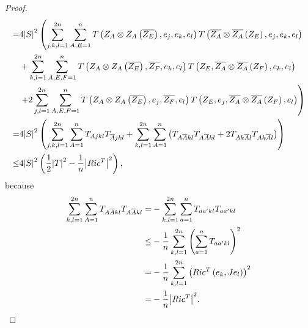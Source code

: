 \documentclass{amsart}
\theoremstyle{definition}
\theoremstyle{remark}
\numberwithin{equation}{section}
\begin{document}
\begin{proof}
\begin{align*}
   =& 4{\left| S \right|^2}\left( {\sum\limits_{j,k,l = 1}^{2n} {\sum\limits_{A,E = 1}^n {T\left( {{Z_A} \otimes {Z_A}\left( {\overline {{Z_E}} } \right),{e_j},{e_k},{e_l}} \right)T\left( {\overline {{Z_A}}  \otimes \overline {{Z_A}} \left( {{Z_E}} \right),{e_j},{e_k},{e_l}} \right)} } } \right. \hfill \\
   &+ \sum\limits_{k,l = 1}^{2n} {\sum\limits_{A,E,F = 1}^n {T\left( {{Z_A} \otimes {Z_A}\left( {\overline {{Z_E}} } \right),\overline {{Z_F}} ,{e_k},{e_l}} \right)T\left( {{Z_E},\overline {{Z_A}}  \otimes \overline {{Z_A}} \left( {{Z_F}} \right),{e_k},{e_l}} \right)} }  \hfill \\
  &\left. { + 2\sum\limits_{j,l = 1}^{2n} {\sum\limits_{A,E,F = 1}^n {T\left( {{Z_A} \otimes {Z_A}\left( {\overline {{Z_E}} } \right),{e_j},\overline {{Z_F}} ,{e_l}} \right)T\left( {{Z_E},{e_j},\overline {{Z_A}}  \otimes \overline {{Z_A}} \left( {{Z_F}} \right),{e_l}} \right)} } } \right) \hfill \\
   =& 4{\left| S \right|^2}\left( {\sum\limits_{j,k,l = 1}^{2n} {\sum\limits_{A = 1}^n {{T_{Ajkl}}{T_{\overline A jkl}}}  + \sum\limits_{k,l = 1}^{2n} {\sum\limits_{A = 1}^n {\left( {{T_{A\overline A kl}}{T_{A\overline A kl}} + 2{T_{Ak\overline A l}}{T_{Ak\overline A l}}} \right)} } } } \right)\\
   \le& 4{\left| S \right|^2}\left( {\frac{1}{2}{{\left| T \right|}^2} - \frac{1}{n}{{\left| {Ri{c^T}} \right|}^2}} \right),
\end{align*}
 because
\begin{align*}
  \sum\limits_{k,l = 1}^{2n} {\sum\limits_{A = 1}^n {{T_{A\overline A kl}}{T_{A\overline A kl}}} }  =&  - \sum\limits_{k,l = 1}^{2n} {\sum\limits_{a = 1}^n {{T_{aa'kl}}{T_{aa'kl}}} }  \hfill \\
   \le&  - \frac{1}{n}\sum\limits_{k,l = 1}^{2n} {{{\left( {\sum\limits_{a = 1}^n {{T_{aa'kl}}} } \right)}^2}}  \hfill \\
   =&  - \frac{1}{n}\sum\limits_{k,l = 1}^{2n} {{{\left( {Ri{c^T}\left( {{e_k},J{e_l}} \right)} \right)}^2}}  \hfill \\
   =&  - \frac{1}{n}{\left| {Ri{c^T}} \right|^2} .
\end{align*}
\end{proof}
\end{document}
